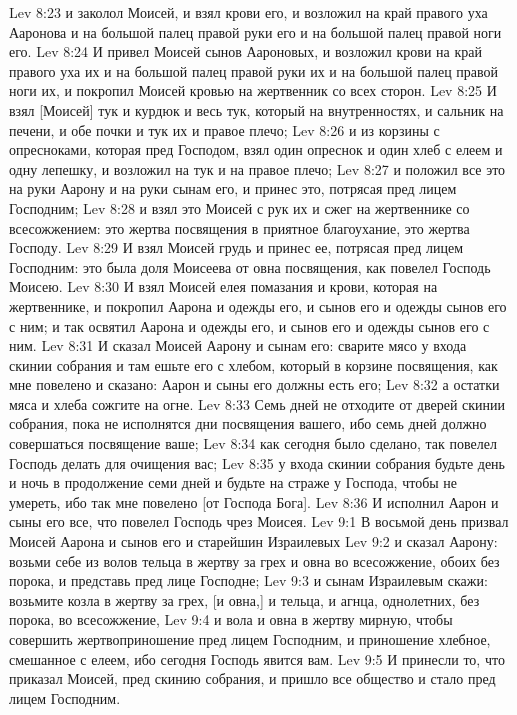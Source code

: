 \vs Lev 8:23 и заколол  Моисей, и взял крови его, и возложил на край правого уха Ааронова и на большой палец правой руки его и на большой палец правой ноги его.
\vs Lev 8:24 И привел Моисей сынов Аароновых, и возложил крови на край правого уха их и на большой палец правой руки их и на большой палец правой ноги их, и покропил Моисей кровью на жертвенник со всех сторон.
\vs Lev 8:25 И взял [Моисей] тук и курдюк и весь тук, который на внутренностях, и сальник на печени, и обе почки и тук их и правое плечо;
\vs Lev 8:26 и из корзины с опресноками, которая пред Господом, взял один опреснок и один хлеб с елеем и одну лепешку, и возложил на тук и на правое плечо;
\vs Lev 8:27 и положил все это на руки Аарону и на руки сынам его, и принес это, потрясая пред лицем Господним;
\vs Lev 8:28 и взял это Моисей с рук их и сжег на жертвеннике со всесожжением: это жертва посвящения в приятное благоухание, это жертва Господу.
\vs Lev 8:29 И взял Моисей грудь и принес ее, потрясая пред лицем Господним: это была доля Моисеева от овна посвящения, как повелел Господь Моисею.
\vs Lev 8:30 И взял Моисей елея помазания и крови, которая на жертвеннике, и покропил Аарона и одежды его, и сынов его и одежды сынов его с ним; и так освятил Аарона и одежды его, и сынов его и одежды сынов его с ним.
\rsbpar\vs Lev 8:31 И сказал Моисей Аарону и сынам его: сварите мясо у входа скинии собрания и там ешьте его с хлебом, который в корзине посвящения, как мне повелено и сказано: Аарон и сыны его должны есть его;
\vs Lev 8:32 а остатки мяса и хлеба сожгите на огне.
\vs Lev 8:33 Семь дней не отходите от дверей скинии собрания, пока не исполнятся дни посвящения вашего, ибо семь дней должно совершаться посвящение ваше;
\vs Lev 8:34 как сегодня было сделано, так повелел Господь делать для очищения вас;
\vs Lev 8:35 у входа скинии собрания будьте день и ночь в продолжение семи дней и будьте на страже у Господа, чтобы не умереть, ибо так мне повелено [от Господа Бога].
\vs Lev 8:36 И исполнил Аарон и сыны его все, что повелел Господь чрез Моисея.
\vs Lev 9:1 В восьмой день призвал Моисей Аарона и сынов его и старейшин Израилевых
\vs Lev 9:2 и сказал Аарону: возьми себе из волов тельца в жертву за грех и овна во всесожжение, обоих без порока, и представь пред лице Господне;
\vs Lev 9:3 и сынам Израилевым скажи: возьмите козла в жертву за грех, [и овна,] и тельца, и агнца, однолетних, без порока, во всесожжение,
\vs Lev 9:4 и вола и овна в жертву мирную, чтобы совершить жертвоприношение пред лицем Господним, и приношение хлебное, смешанное с елеем, ибо сегодня Господь явится вам.
\vs Lev 9:5 И принесли то, что приказал Моисей, пред скинию собрания, и пришло все общество и стало пред лицем Господним.
